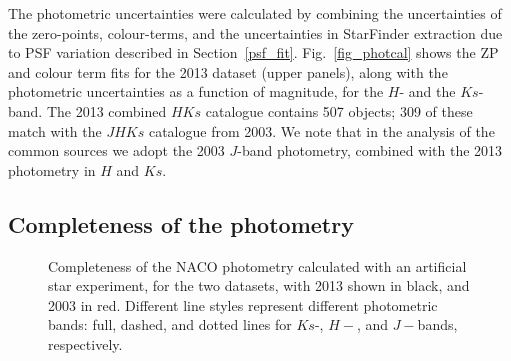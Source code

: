 \documentclass[a4paper,fleqn,usenatbib]{mnras}
\begin{document}


The photometric uncertainties were calculated by combining the uncertainties of the zero-points,
colour-terms, and the uncertainties in {\sc StarFinder}  extraction due to PSF variation described in Section~\ref{psf_fit}.
Fig.~\ref{fig_photcal} shows the ZP and colour term fits for the 2013 dataset (upper panels), along with
the photometric uncertainties as a function of magnitude, for the $H$- and the $Ks$-band.
The 2013 combined $HKs$ catalogue contains 507 objects; 309 of these match with the $JHKs$ catalogue from 2003.
We note that in the analysis of the common sources we adopt the 2003 $J$-band photometry, combined with the 2013 photometry in $H$ and $Ks$.

\subsection{Completeness of the photometry}
\begin{figure}
\centering
{}
\caption{Completeness of the NACO photometry calculated with an artificial star experiment, for the two datasets, with 2013 shown in black, and 2003 in red. 
Different line styles represent different photometric bands: full, dashed, and dotted lines for $Ks$-, $H-$, and $J-$bands, respectively.}
\label{fig_compl}
\end{figure}
\end{document}
